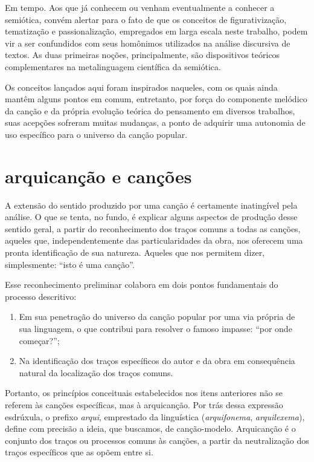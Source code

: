 Em tempo. Aos que já conhecem ou venham eventualmente a conhecer a
semiótica, convém alertar para o fato de que os conceitos de
figurativização, tematização e passionalização, empregados em larga
escala neste trabalho, podem vir a ser confundidos com seus homônimos
utilizados na análise discursiva de textos. As duas primeiras noções,
principalmente, são dispositivos teóricos complementares na
metalinguagem científica da semiótica.

Os conceitos lançados aqui foram inspirados naqueles, com os quais ainda
mantêm alguns pontos em comum, entretanto, por força do componente
melódico da canção e da própria evolução teórica do pensamento em
diversos trabalhos, suas acepções sofreram muitas mudanças, a ponto de
adquirir uma autonomia de uso específico para o universo da canção
popular.

\section{arquicanção e canções}

A extensão do sentido produzido por uma canção é certamente inatingível
pela análise. O que se tenta, no fundo, é explicar alguns aspectos de
produção desse sentido geral, a partir do reconhecimento dos traços
comuns a todas as canções, aqueles que, independentemente das
particularidades da obra, nos oferecem uma pronta identificação de sua
natureza. Aqueles que nos permitem dizer, simplesmente: ``isto é uma
canção''.

Esse reconhecimento preliminar colabora em dois pontos fundamentais do
processo descritivo:

\begin{enumerate}[label=\scshape\alph*.]
\item Em sua penetração do universo da canção popular por uma via própria
de sua linguagem, o que contribui para resolver o famoso impasse: ``por
onde começar?'';

\item Na identificação dos traços específicos do autor e da obra em
consequência natural da localização dos traços comuns.
\end{enumerate}

Portanto, os princípios conceituais estabelecidos nos itens anteriores
não se referem às canções específicas, mas à arquicanção. Por trás dessa
expressão esdrúxula, o prefixo \textit{arqui}, emprestado da linguística
(\textit{arquifonema}, \textit{arquilexema}), define com precisão a ideia, que buscamos,
de canção-modelo. Arquicanção é o conjunto dos traços ou processos
comuns às canções, a partir da neutralização dos traços específicos que
as opõem entre si.

